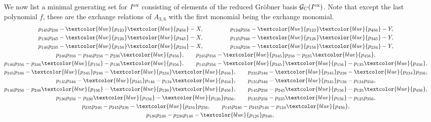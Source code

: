 \documentclass[pdftex]{sigma}%
\numberwithin{equation}{section}
\begin{document}
\medskip
{}
We now list a minimal generating set for $I^{\rm ex}$
consisting of elements of the reduced Gr\"obner basis $\mathcal G_C(I^{\rm ex})$. Note that except the last polynomial $f$, these are the exchange relations of $A_{3,6}$ with the first monomial being the exchange monomial.
\begin{gather*}
 p_{145}p_{236} - \textcolor{blue}{p_{123}}\textcolor{blue}{p_{456}} - X,\qquad\qquad\ \
 p_{124}p_{356} - \textcolor{blue}{p_{123}}\textcolor{blue}{p_{456}} - Y,
\\
 p_{136}p_{245} - \textcolor{blue}{p_{126}}\textcolor{blue}{p_{345}} - X,\qquad\qquad\ \
 p_{125}p_{346} - \textcolor{blue}{p_{126}}\textcolor{blue}{p_{345}} - Y,
\\
 p_{146}p_{235} - \textcolor{blue}{p_{156}}\textcolor{blue}{p_{234}} - X,\qquad\qquad\ \
 p_{134}p_{256} - \textcolor{blue}{p_{156}}\textcolor{blue}{p_{234}} - Y,
\\
 p_{246}p_{356} - p_{346}p_{256} - p_{236}\textcolor{blue}{p_{456}},\qquad
 p_{245}p_{356} - \textcolor{blue}{p_{345}}p_{256} - p_{235}\textcolor{blue}{p_{456}},
\\
 p_{146}p_{356} - p_{346}\textcolor{blue}{p_{156}} - p_{136}\textcolor{blue}{p_{456}},\qquad
 p_{145}p_{356} - \textcolor{blue}{p_{345}}\textcolor{blue}{p_{156}} - p_{135}\textcolor{blue}{p_{456}},
\\
 p_{245}p_{346} - \textcolor{blue}{p_{345}}p_{246} - \textcolor{blue}{p_{234}}\textcolor{blue}{p_{456}},\qquad
 p_{235}p_{346} - \textcolor{blue}{p_{345}}p_{236} - \textcolor{blue}{p_{234}}p_{356},
\\
 p_{145}p_{346} - \textcolor{blue}{p_{345}}p_{146} - p_{134}\textcolor{blue}{p_{456}},\qquad
 p_{135}p_{346} - \textcolor{blue}{p_{345}}p_{136} - p_{134}p_{356},
\\
 p_{146}p_{256} - p_{246}\textcolor{blue}{p_{156}} - \textcolor{blue}{p_{126}}\textcolor{blue}{p_{456}},\qquad
 p_{145}p_{256} - p_{245}\textcolor{blue}{p_{156}} - p_{125}\textcolor{blue}{p_{456}},
\\
 p_{136}p_{256} - p_{236}\textcolor{blue}{p_{156}} - \textcolor{blue}{p_{126}}p_{356},\qquad
 p_{135}p_{256} - p_{235}\textcolor{blue}{p_{156}} - p_{125}p_{356},
\\
 p_{235}p_{246} - p_{245}p_{236} - \textcolor{blue}{p_{234}}p_{256},\qquad
 p_{145}p_{246} - p_{245}p_{146} - p_{124}\textcolor{blue}{p_{456}},
\\
 p_{136}p_{246} - p_{236}p_{146} - \textcolor{blue}{p_{126}}p_{346},\qquad

\end{gather*}
\end{document}
